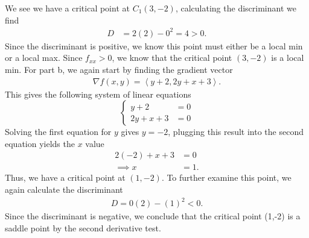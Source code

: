 \documentclass{report}
\begin{document}
    We see we have a critical point at $C_{1}(3,-2)$, calculating the discriminant we find
    \begin{align*}
        D &= 2(2) - 0^{2} = 4 > 0 
    .\end{align*}
    Since the discriminant is positive, we know this point must either be a local min or a local max. Since $f_{xx} >0$, we know that the critical point $(3,-2)$ is a local min. 
    \pagebreak \bigbreak \noindent 
    For part b, we again start by finding the gradient vector
    \begin{align*}
        \nabla f(x,y) = \left\langle y+2, 2y+x+3 \right\rangle
    .\end{align*}
    This gives the following system of linear equations
       \begin{equation}
            \begin{cases}
                 y+2&=0  \\
                 2y+x+3&=0 
            \end{cases}
        \end{equation}
        \bigbreak \noindent 
        Solving the first equation for $y$ gives $y =-2$, plugging this result into the second equation yields the $x$ value
        \begin{align*}
            2(-2) + x +3 &= 0 \\
            \implies x &=1
        .\end{align*}
        \bigbreak \noindent 
        Thus, we have a critical point at $(1,-2)$. To further examine this point, we again calculate the discriminant
        \begin{align*}
            D = 0(2) - (1)^{2} < 0 
        .\end{align*}
        \bigbreak \noindent 
        Since the discriminant is negative, we conclude that the critical point (1,-2) is a saddle point by the second derivative test.
\end{document}
